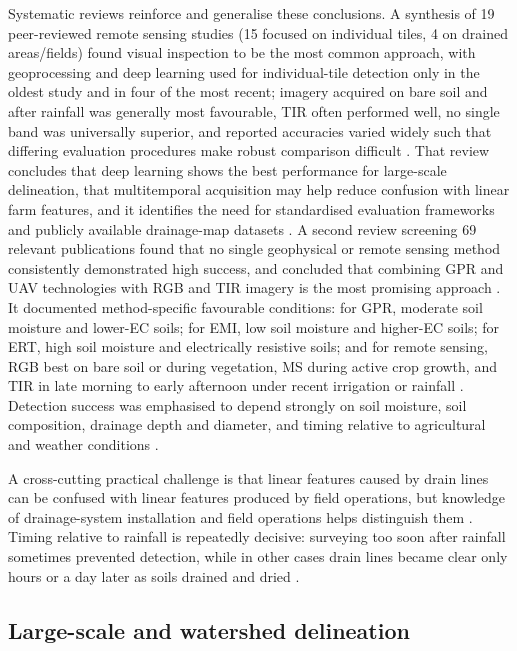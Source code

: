 \documentclass[11pt]{article}
\begin{document}
Systematic reviews reinforce and generalise these conclusions. A synthesis of 19 peer-reviewed remote sensing studies (15 focused on individual tiles, 4 on drained areas/fields) found visual inspection to be the most common approach, with geoprocessing and deep learning used for individual-tile detection only in the oldest study and in four of the most recent; imagery acquired on bare soil and after rainfall was generally most favourable, TIR often performed well, no single band was universally superior, and reported accuracies varied widely such that differing evaluation procedures make robust comparison difficult \parencite{Carlsen2024}. That review concludes that deep learning shows the best performance for large-scale delineation, that multitemporal acquisition may help reduce confusion with linear farm features, and it identifies the need for standardised evaluation frameworks and publicly available drainage-map datasets \parencite{Carlsen2024}. A second review screening 69 relevant publications found that no single geophysical or remote sensing method consistently demonstrated high success, and concluded that combining GPR and UAV technologies with RGB and TIR imagery is the most promising approach \parencite{Wienken2024}. It documented method-specific favourable conditions: for GPR, moderate soil moisture and lower-EC soils; for EMI, low soil moisture and higher-EC soils; for ERT, high soil moisture and electrically resistive soils; and for remote sensing, RGB best on bare soil or during vegetation, MS during active crop growth, and TIR in late morning to early afternoon under recent irrigation or rainfall \parencite{Wienken2024}. Detection success was emphasised to depend strongly on soil moisture, soil composition, drainage depth and diameter, and timing relative to agricultural and weather conditions \parencite{Wienken2024}.

A cross-cutting practical challenge is that linear features caused by drain lines can be confused with linear features produced by field operations, but knowledge of drainage-system installation and field operations helps distinguish them \parencite{Allred2020}. Timing relative to rainfall is repeatedly decisive: surveying too soon after rainfall sometimes prevented detection, while in other cases drain lines became clear only hours or a day later as soils drained and dried \parencite{Allred2020}.

\subsection{Large-scale and watershed delineation}
\end{document}
